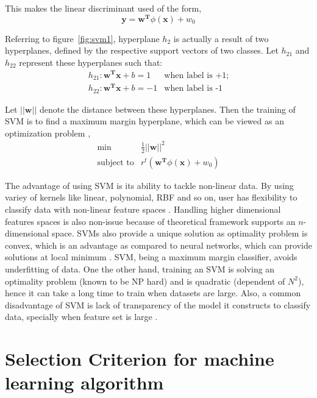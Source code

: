 This makes the linear discriminant used of the form,
\[\boldsymbol{y} = \boldsymbol{w^T}\phi(\boldsymbol{x}) + w_0 \]

Referring to figure~\ref{fig:svm1}, hyperplane $h_2$ is actually a result of two hyperplanes, defined by the respective support vectors of two classes. Let $h_{21}$ and $h_{22}$ represent these hyperplanes	such that:
\[\begin{array}{ll} 
h_{21}: \boldsymbol{w^T}\boldsymbol{x} + b = 1 & \mbox{when label is +1};\\
h_{22}: \boldsymbol{w^T}\boldsymbol{x} + b = -1 & \mbox{when label is -1}
\end{array} \]

Let $||\boldsymbol{w}||$ denote the distance between these hyperplanes. Then the training of SVM is to find a maximum margin hyperplane, which can be viewed as an optimization problem \cite{Vapnik1995, Chang2011},
\[\begin{array}{ll} 
 \min &\frac{1}{2} ||\boldsymbol{w}||^2 \\
 \mbox{subject to} & r^t(\boldsymbol{w^T}\phi(\boldsymbol{x}) + w_0) 
\end{array}\]

The advantage of using SVM is its ability to tackle non-linear data. By using variey of kernels like linear, polynomial, RBF and so on, user has flexibility to classify data with non-linear feature spaces \cite {Chang2011}. Handling higher dimensional features spaces is also non-issue because of theoretical framework \cite{Vapnik1995} supports an $n$-dimensional space. SVMs also provide a unique solution as optimality problem is convex, which is an advantage as compared to neural networks, which can provide solutions at local minimum \cite{Auria2008}. SVM, being a maximum margin classifier, avoids underfitting of data. One the other hand, training an SVM is solving an optimality problem (known to be NP hard) and is quadratic (dependent of $N^2$), hence it can take a long time to train when datasets are large. Also, a common disadvantage of SVM is lack of transparency of the model it constructs to classify data, specially when feature set is large \cite{Auria2008}.

\section{Selection Criterion for machine learning algorithm}

